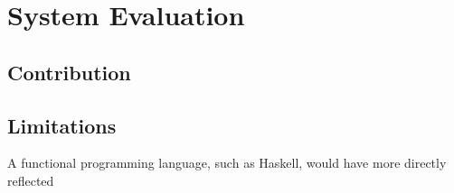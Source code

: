 \documentclass[../Dissertation.tex]{subfiles}
\begin{document}
\section{System Evaluation}
\subsection{Contribution}

\subsection{Limitations}

A functional programming language, such as Haskell, would have more directly reflected 
\end{document}
